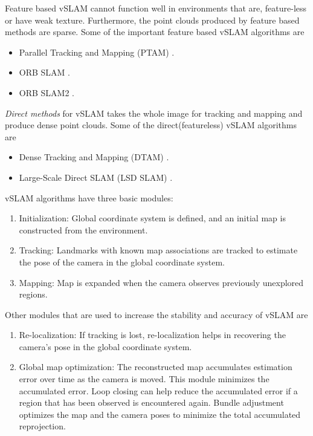 Feature based vSLAM cannot function well in environments that are, feature-less or have weak texture. Furthermore, the point clouds produced by feature based methods are sparse. Some of the important feature based vSLAM algorithms are

\begin{itemize}
	\item Parallel Tracking and Mapping (PTAM) \cite{4538852}.
	\item ORB SLAM \cite{7219438}.
	\item ORB SLAM2 \cite{7946260}.
	
\end{itemize}


\textit{Direct methods} for vSLAM takes the whole image for tracking and mapping and produce dense point clouds. Some of the direct(featureless) vSLAM algorithms are

\begin{itemize}
	\item Dense Tracking and Mapping (DTAM) \cite{6126513}.
	\item Large-Scale Direct SLAM (LSD SLAM) \cite{Engel2014LSDSLAMLD}.
\end{itemize}

vSLAM algorithms have three basic modules:
\begin{enumerate}
	\item Initialization: Global coordinate system is defined, and an initial map is constructed from the environment.
	\item Tracking: Landmarks with known map associations are tracked to estimate the pose of the camera in the global coordinate system.
	\item Mapping: Map is expanded when the camera observes previously unexplored regions.
\end{enumerate}

Other modules that are used to increase the stability and accuracy of vSLAM are
\begin{enumerate}
	\item Re-localization: If tracking is lost, re-localization helps in recovering the camera's pose in the global coordinate system.
	\item Global map optimization: The reconstructed map accumulates estimation error over time as the camera is moved. This module minimizes the accumulated error. Loop closing can help reduce the accumulated error if a region that has been observed is encountered again. Bundle adjustment optimizes the map and the camera poses to minimize the total accumulated reprojection.
\end{enumerate}


